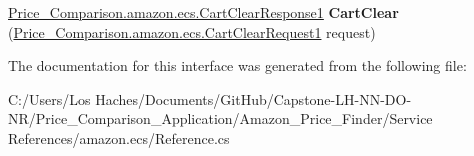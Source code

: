 \begin{DoxyCompactItemize}
\item 
\hypertarget{interface_price___comparison_1_1amazon_1_1ecs_1_1_a_w_s_e_commerce_service_port_type_a8b831e60884c082335d7d55b62c028f5}{\hyperlink{class_price___comparison_1_1amazon_1_1ecs_1_1_cart_clear_response1}{Price\-\_\-\-Comparison.\-amazon.\-ecs.\-Cart\-Clear\-Response1} {\bfseries Cart\-Clear} (\hyperlink{class_price___comparison_1_1amazon_1_1ecs_1_1_cart_clear_request1}{Price\-\_\-\-Comparison.\-amazon.\-ecs.\-Cart\-Clear\-Request1} request)}\label{interface_price___comparison_1_1amazon_1_1ecs_1_1_a_w_s_e_commerce_service_port_type_a8b831e60884c082335d7d55b62c028f5}

\end{DoxyCompactItemize}


The documentation for this interface was generated from the following file\-:\begin{DoxyCompactItemize}
\item 
C\-:/\-Users/\-Los Haches/\-Documents/\-Git\-Hub/\-Capstone-\/\-L\-H-\/\-N\-N-\/\-D\-O-\/\-N\-R/\-Price\-\_\-\-Comparison\-\_\-\-Application/\-Amazon\-\_\-\-Price\-\_\-\-Finder/\-Service References/amazon.\-ecs/Reference.\-cs\end{DoxyCompactItemize}
